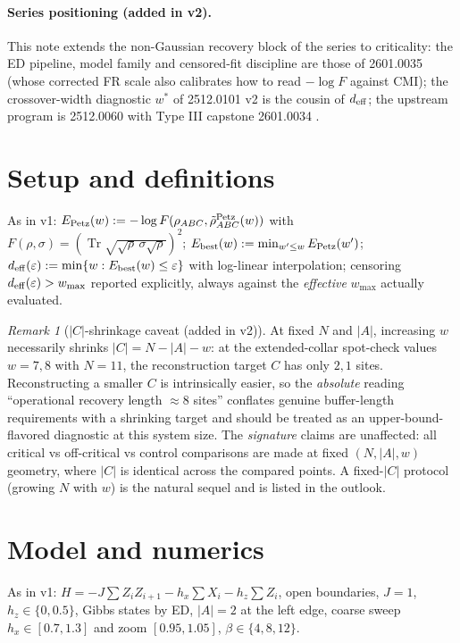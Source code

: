 \documentclass[11pt]{article}
\theoremstyle{remark}
\newtheorem{remark}{Remark}[section]
\newcommand{\Tr}{\operatorname{Tr}}
\newcommand{\deff}{d_{\rm eff}}
\begin{document}
\paragraph{Series positioning (added in v2).} This note extends the
non-Gaussian recovery block of the series to criticality: the ED pipeline,
model family and censored-fit discipline are those of 2601.0035
\cite{S0035} (whose corrected FR scale also calibrates how to read
$-\log F$ against CMI); the crossover-width diagnostic $w^*$ of 2512.0101
v2 \cite{S0101} is the cousin of $\deff$; the upstream program is
2512.0060 \cite{S0060} with Type III capstone 2601.0034 \cite{S0034}.

\section{Setup and definitions}
As in v1: $E_{\rm Petz}(w) := -\log F(\rho_{ABC},
\tilde\rho^{\rm Petz}_{ABC}(w))$ with $F(\rho,\sigma) =
(\Tr\sqrt{\sqrt\rho\,\sigma\sqrt\rho})^2$; $E_{\rm best}(w) :=
\min_{w'\le w} E_{\rm Petz}(w')$; $\deff(\varepsilon) := \min\{w :
E_{\rm best}(w) \le \varepsilon\}$ with log-linear interpolation;
censoring $\deff(\varepsilon) > w_{\max}$ reported explicitly, always
against the \emph{effective} $w_{\max}$ actually evaluated.

\begin{remark}[$|C|$-shrinkage caveat (added in v2)]
\label{rem:cshrink}
At fixed $N$ and $|A|$, increasing $w$ necessarily shrinks $|C| = N - |A|
- w$: at the extended-collar spot-check values $w = 7, 8$ with $N = 11$,
the reconstruction target $C$ has only $2, 1$ sites. Reconstructing a
smaller $C$ is intrinsically easier, so the \emph{absolute} reading
``operational recovery length $\approx 8$ sites'' conflates genuine
buffer-length requirements with a shrinking target and should be treated
as an upper-bound-flavored diagnostic at this system size. The
\emph{signature} claims are unaffected: all critical vs off-critical vs
control comparisons are made at fixed $(N, |A|, w)$ geometry, where $|C|$
is identical across the compared points. A fixed-$|C|$ protocol (growing
$N$ with $w$) is the natural sequel and is listed in the outlook.
\end{remark}

\section{Model and numerics}
As in v1: $H = -J\sum Z_iZ_{i+1} - h_x\sum X_i - h_z\sum Z_i$, open
boundaries, $J = 1$, $h_z \in \{0, 0.5\}$, Gibbs states by ED, $|A| = 2$
at the left edge, coarse sweep $h_x \in [0.7, 1.3]$ and zoom $[0.95,
1.05]$, $\beta \in \{4, 8, 12\}$.
\end{document}
